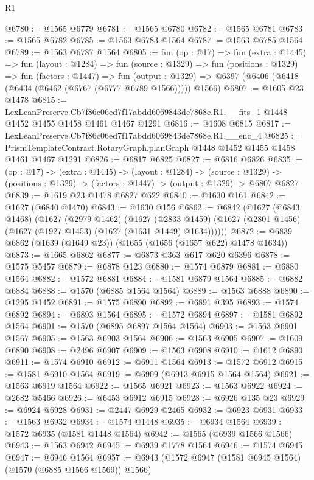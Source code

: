 \begin{lexlean}{R1}
\begin{coremodule}
@6780 := @1565 @6779
@6781 := @1565 @6780
@6782 := @1565 @6781
@6783 := @1565 @6782
@6785 := @1563 @6783 @1564
@6787 := @1563 @6785 @1564
@6789 := @1563 @6787 @1564
@6805 := fun (op : @17) =>
  fun (extra : @1445) =>
  fun (layout : @1284) =>
  fun (source : @1329) =>
  fun (positions : @1329) =>
  fun (factors : @1447) =>
  fun (output : @1329) => @6397 (@6406 (@6418 (@6434 (@6462 (@6767 (@6777 @6789 @1566))))) @1566)
@6807 := @1605 @23 @1478
@6815 := LexLeanPreserve.Cb7f86c06ed7f17abdd6069843de7868e.R1.__fits_1
    @1448
    @1452
    @1455
    @1458
    @1461
    @1467
    @1291
@6816 := @1608 @6815
@6817 := LexLeanPreserve.Cb7f86c06ed7f17abdd6069843de7868e.R1.__enc_4
@6825 := PrismTemplateContract.RotaryGraph.planGraph @1448 @1452 @1455 @1458 @1461 @1467 @1291
@6826 := @6817 @6825
@6827 := @6816 @6826
@6835 := (op : @17) ->
  (extra : @1445) ->
  (layout : @1284) ->
  (source : @1329) -> (positions : @1329) -> (factors : @1447) -> (output : @1329) -> @6807 @6827
@6839 := @1619 @23 @1478 @6827 @622
@6840 := @1630 @161
@6842 := @1627 (@6840 @1470)
@6843 := @1630 @156
@6862 := @6842
    (@1627
      (@6843 @1468)
      (@1627
        (@2979 @1462)
        (@1627
          (@2833 @1459)
          (@1627 (@2801 @1456) (@1627 (@1927 @1453) (@1627 (@1631 @1449) @1634))))))
@6872 := @6839 @6862 (@1639 (@1649 @23)) (@1655 (@1656 (@1657 @622) @1478 @1634))
@6873 := @1665 @6862
@6877 := @6873 @363 @617 @620 @6396
@6878 := @1575 @5457
@6879 := @6878 @123
@6880 := @1574 @6879
@6881 := @6880 @1564
@6882 := @1572 @6881
@6884 := @1581 @6879 @1564
@6885 := @6882 @6884
@6888 := @1570 (@6885 @1564 @1564)
@6889 := @1563 @6888
@6890 := @1295 @1452
@6891 := @1575 @6890
@6892 := @6891 @395
@6893 := @1574 @6892
@6894 := @6893 @1564
@6895 := @1572 @6894
@6897 := @1581 @6892 @1564
@6901 := @1570 (@6895 @6897 @1564 @1564)
@6903 := @1563 @6901 @1567
@6905 := @1563 @6903 @1564
@6906 := @1563 @6905
@6907 := @1609 @6890
@6908 := @2496 @6907
@6909 := @1563 @6908
@6910 := @1612 @6890
@6911 := @1574 @6910
@6912 := @6911 @1564
@6913 := @1572 @6912
@6915 := @1581 @6910 @1564
@6919 := @6909 (@6913 @6915 @1564 @1564)
@6921 := @1563 @6919 @1564
@6922 := @1565 @6921
@6923 := @1563 @6922
@6924 := @2682 @5466
@6926 := @6453 @6912 @6915
@6928 := @6926 @135 @23
@6929 := @6924 @6928
@6931 := @2447 @6929 @2465
@6932 := @6923 @6931
@6933 := @1563 @6932
@6934 := @1574 @1448
@6935 := @6934 @1564
@6939 := @1572 @6935 (@1581 @1448 @1564)
@6942 := @1565 (@6939 @1566 @1566)
@6943 := @1563 @6942
@6945 := @6939 @1778 @1564
@6946 := @1574 @6945
@6947 := @6946 @1564
@6957 := @6943 (@1572 @6947 (@1581 @6945 @1564) (@1570 (@6885 @1566 @1569)) @1566)

\end{coremodule}
\end{lexlean}
